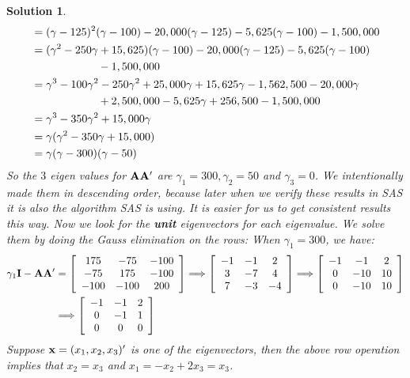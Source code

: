 \documentclass[11pt]{article}
\newtheorem{sol}{Solution}
\begin{document}
\begin{sol}
\begin{align*}
	 	&= (\gamma - 125)^2(\gamma - 100) - 20,000(\gamma - 125) - 5,625(\gamma - 100) - 1,500,000\\
	 	&= (\gamma^2 -  250\gamma + 15,625)(\gamma - 100) - 20,000(\gamma - 125) - 5,625(\gamma - 100) \\
	 	&\ \hskip 2cm - 1,500,000\\
	 	&= \gamma^3 - 100\gamma^2 - 250\gamma^2 + 25,000\gamma + 15,625\gamma - 1,562,500 - 20,000\gamma \\
	 	&\ \hskip 2cm + 2,500,000 - 5,625\gamma + 256,500 - 1,500,000\\
	 	&= \gamma^3 - 350\gamma^2 + 15,000\gamma\\
	 	&= \gamma(\gamma^2 - 350\gamma + 15,000)\\
	 	&= \gamma(\gamma - 300)(\gamma - 50)
	 \end{align*}
	 So the $3$ eigen values for ${\bf A}{\bf A}'$ are $\gamma_1 =300, \gamma_2 = 50$ and $\gamma_3 = 0$.\vskip 2mm
	 We intentionally made them in descending order, because later when we verify these results in SAS it is also the algorithm SAS is using. It is easier for us to get consistent results this way.\vskip 2mm
	 Now we look for the {\bf unit} eigenvectors for each eigenvalue. We solve them by doing the Gauss elimination on the rows:\vskip 2mm
	 When $\gamma_1= 300$, we have:
	 \begin{align*}
	 	\gamma_1{\bf I} - {\bf A}{\bf A}' &= \left[\begin{array}{ccc} 175&-75 &-100 \\ -75&175&-100 \\ -100&-100&200\end{array}\right]
	 	\Longrightarrow 
	 	\left[\begin{array}{ccc}-1&-1&2\\ 3  &-7&4\\7&-3&-4 \end{array}\right]
	 	\Longrightarrow
	 	\left[\begin{array}{ccc} -1& -1&2\\ 0&-10 &10\\ 0&-10 &10\end{array}\right]\\
	 	&\Longrightarrow \left[\begin{array}{ccc} -1&-1 &2\\ 0&-1 &1\\ 0&0 &0\end{array}\right]
	 \end{align*}
	 Suppose ${\bf x} = (x_1, x_2, x_3)'$ is one of the eigenvectors, then the above row operation implies that $x_2 = x_3$ and $x_1 = -x_2 + 2x_3 = x_3$.\vskip 2mm

\end{sol}
\end{document}
